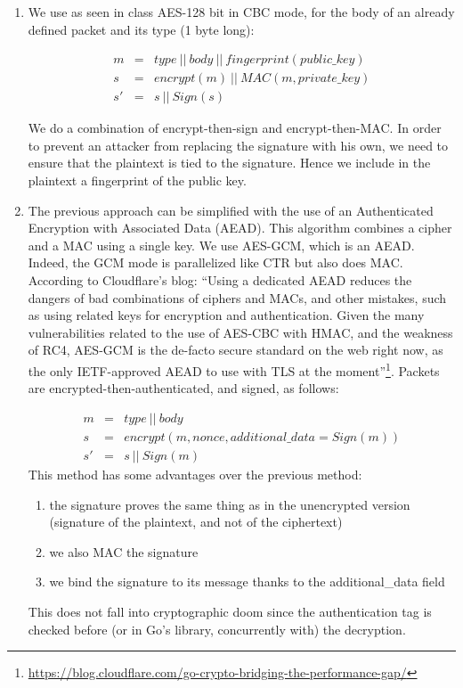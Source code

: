 \documentclass[12pt,a4paper]{article}
\begin{document}
 \begin{enumerate}
    \item We use as seen in class AES-128 bit in CBC mode, for the body of an already defined packet and its type (1 byte long):
 
 \[
     \begin{array}{lll}
       m& =&type \ || \ body \ || \ fingerprint(public\_key)\\
 s&=&encrypt(m) \ || \ MAC(m,private\_key)\\
       s'&=&s \ || \ Sign(s)
\end{array}
\]

          We do a combination of encrypt-then-sign and encrypt-then-MAC. In order to prevent an attacker from replacing the signature with his own, we need to ensure that the plaintext is tied to the signature. Hence we include in the plaintext a fingerprint of the public key.


\item The previous approach can be simplified with the use of an Authenticated Encryption with Associated Data (AEAD). This algorithm combines a cipher and a MAC using a single key. We use AES-GCM, which is an AEAD. Indeed, the GCM mode is parallelized like CTR but also does MAC. According to Cloudflare's blog: ``Using a dedicated AEAD reduces the dangers of bad combinations of ciphers and MACs, and other mistakes, such as using related keys for encryption and authentication.
  Given the many vulnerabilities related to the use of AES-CBC with HMAC, and the weakness of RC4, AES-GCM is the de-facto secure standard on the web right now, as the only IETF-approved AEAD to use with TLS at the moment''\footnote{\url{https://blog.cloudflare.com/go-crypto-bridging-the-performance-gap/}}.
  Packets are encrypted-then-authenticated, and signed, as follows:
 
 \[
     \begin{array}{lll}
       m& =&type \ || \ body\\
 s&=&encrypt(m,nonce,additional\_data=Sign(m))\\
       s'&=&s \ || \ Sign(m)
\end{array}
\]
This method has some advantages over the previous method:
\begin{enumerate}\item the signature proves the same thing as in the unencrypted version (signature of the plaintext, and not of the ciphertext)
\item we also MAC the signature
\item we bind the signature to its message thanks to the additional\_data field
\end{enumerate}
This does not fall into cryptographic doom since the authentication tag is checked before (or in Go's library, concurrently with) the decryption.


\end{enumerate}
\end{document}
